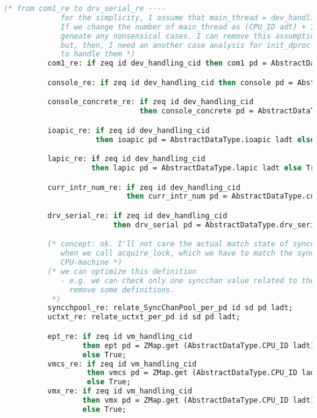 \begin{lstlisting}[language=Caml]
          (* from com1_re to drv_serial_re ----
             for the simplicity, I assume that main_thread = dev_handling_cid. 
             If we change the number of main_thread as (CPU_ID adt) + 1, then, this assumption doesn't 
             geneate any nonsensical cases. I can remove this assumption (main_thread = dev_handling_cid), 
             but, then, I need an another case analysis for init_dproc in (EAsm.v and TAsm.v files) 
             to handle them *)
          com1_re: if zeq id dev_handling_cid then com1 pd = AbstractDataType.com1 ladt else True;

          console_re: if zeq id dev_handling_cid then console pd = AbstractDataType.console ladt else True;

          console_concrete_re: if zeq id dev_handling_cid 
                               then console_concrete pd = AbstractDataType.console_concrete ladt else True;

          ioapic_re: if zeq id dev_handling_cid 
                     then ioapic pd = AbstractDataType.ioapic ladt else True;

          lapic_re: if zeq id dev_handling_cid 
                    then lapic pd = AbstractDataType.lapic ladt else True;

          curr_intr_num_re: if zeq id dev_handling_cid 
                            then curr_intr_num pd = AbstractDataType.curr_intr_num ladt else True;

          drv_serial_re: if zeq id dev_handling_cid 
                         then drv_serial pd = AbstractDataType.drv_serial ladt else True;

          (* concept: ok. I'll not care the actual match state of syncchpool except the case 
             when we call acquire_lock, which we have to match the syncchpool with thread-machine with 
             CPU-machine *)
          (* we can optimize this definition 
             - e.g. we can check only one syncchan value related to the lock id. Then, I may be able to 
               remove some definitions. 
           *)
          syncchpool_re: relate_SyncChanPool_per_pd id sd pd ladt;
          uctxt_re: relate_uctxt_per_pd id sd pd ladt;

          ept_re: if zeq id vm_handling_cid
                  then ept pd = ZMap.get (AbstractDataType.CPU_ID ladt) (AbstractDataType.ept ladt)
                  else True;
          vmcs_re: if zeq id vm_handling_cid
                   then vmcs pd = ZMap.get (AbstractDataType.CPU_ID ladt) (AbstractDataType.vmcs ladt)
                   else True;
          vmx_re: if zeq id vm_handling_cid
                  then vmx pd = ZMap.get (AbstractDataType.CPU_ID ladt) (AbstractDataType.vmx ladt)
                  else True;


\end{lstlisting}
